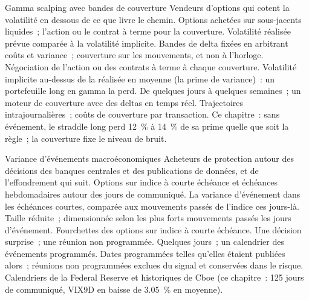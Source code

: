 \begin{strategyfile}{Gamma scalping avec bandes de couverture}\label{strat:s2:gamma-scalping-and-event-volatility:bands}
 Vendeurs d'options qui cotent la volatilité en dessous de ce que livre le chemin.
 Options achetées sur sous-jacents liquides~; l'action ou le contrat à terme pour la couverture.
 Volatilité réalisée prévue comparée à la volatilité implicite.
 Bandes de delta fixées en arbitrant coûts et variance~; couverture sur les mouvements, et non à l'horloge.
 Négociation de l'action ou des contrats à terme à chaque couverture.
 Volatilité implicite au-dessus de la réalisée en moyenne (la prime de variance)~: un portefeuille long en gamma la perd.
 De quelques jours à quelques semaines~; un moteur de couverture avec des deltas en temps réel.
 Trajectoires intrajournalières~; coûts de couverture par transaction.
 Ce chapitre~: sans événement, le straddle long perd 12~\% à 14~\% de sa prime quelle que soit la règle~; la couverture fixe le niveau de bruit.
\end{strategyfile}

\begin{strategyfile}{Variance d'événements macroéconomiques}\label{strat:s2:gamma-scalping-and-event-volatility:macro}
 Acheteurs de protection autour des décisions des banques centrales et des publications de données, et de l'effondrement qui suit.
 Options sur indice à courte échéance et échéances hebdomadaires autour des jours de communiqué.
 La variance d'événement dans les échéances courtes, comparée aux mouvements passés de l'indice ces jours-là.
 Taille réduite~; dimensionnée selon les plus forts mouvements passés les jours d'événement.
 Fourchettes des options sur indice à courte échéance.
 Une décision surprise~; une réunion non programmée.
 Quelques jours~; un calendrier des événements programmés.
 Dates programmées telles qu'elles étaient publiées alors~; réunions non programmées exclues du signal et conservées dans le risque.
 Calendriers de la Federal Reserve et historiques de Cboe (ce chapitre~: 125 jours de communiqué, VIX9D en baisse de 3.05~\% en moyenne).
\end{strategyfile}

